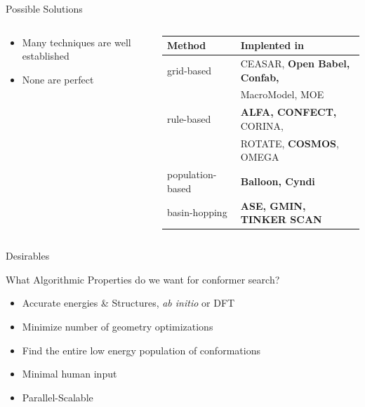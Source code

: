 \documentclass[10pt]{beamer}
\begin{document}
{%
\begin{frame}[fragile]{Possible Solutions}
	\begin{columns}[c] %
		\begin{column}{.4\textwidth}
			\begin{itemize}[<+->]
				\item {Many techniques are well established}
				\item {None are perfect}
			\end{itemize}
		\end{column}
		\hfill
		\begin{column}{.65\textwidth}
			\footnotesize
			\begin{tabular}{ l  l}
				Method & Implented in
				\\ \midrule
				grid-based & CEASAR, \textbf{Open Babel, Confab,} \\
				           & MacroModel, MOE  \\
				rule-based & \textbf{ALFA, CONFECT,} CORINA, \\
				           & ROTATE, \textbf{COSMOS}, OMEGA \\
				population-based & \textbf{Balloon, Cyndi} \\
				basin-hopping & \textbf{ASE, GMIN, TINKER SCAN} \\
			\end{tabular}
		\end{column}
	\end{columns}
\end{frame}
}

\begin{frame}{Desirables}
	\begin{block}{What Algorithmic Properties do we want for conformer search?}
		\begin{itemize}[<+->]
			\item[1.] Accurate energies \& Structures, \emph{ab initio} or DFT
			\item[2.] {Minimize number of geometry optimizations}
			\item[3.] {Find the entire low energy population of conformations}
			\item[4.] {Minimal human input}
			\item[5.] {Parallel-Scalable}
		\end{itemize}
	\end{block}
\end{frame}
\end{document}
